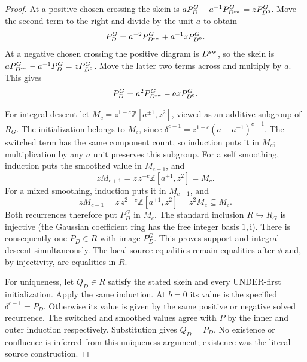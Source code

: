 \begin{proof}
At a positive chosen crossing the skein is
$aP_D^G-a^{-1}P_{D^{\rm sw}}^G=zP_{D^0}^G$.
Move the second term to the right and divide by the unit $a$ to obtain
\begin{equation}\label{lp:positive}
 P_D^G=a^{-2}P_{D^{\rm sw}}^G+a^{-1}zP_{D^0}^G.
\end{equation}
At a negative chosen crossing the positive diagram is $D^{\rm sw}$,
so the skein is $aP_{D^{\rm sw}}^G-a^{-1}P_D^G=zP_{D^0}^G$.
Move the latter two terms across and multiply by $a$. This gives
\begin{equation}\label{lp:negative}
 P_D^G=a^2P_{D^{\rm sw}}^G-azP_{D^0}^G.
\end{equation}

For integral descent let $M_c=z^{1-c}\mathbb Z[a^{\pm1},z^2]$,
viewed as an additive subgroup of $R_G$. The initialization belongs to
$M_c$, since $\delta^{c-1}=z^{1-c}(a-a^{-1})^{c-1}$.
The switched term has the same component count, so induction puts it in
$M_c$; multiplication by any $a$ unit preserves this subgroup. For a self
smoothing, induction puts the smoothed value in $M_{c+1}$, and
\begin{equation}\label{lp:self-support}
 zM_{c+1}=z\,z^{-c}\mathbb Z[a^{\pm1},z^2]=M_c.
\end{equation}
For a mixed smoothing, induction puts it in $M_{c-1}$, and
\begin{equation}\label{lp:mixed-support}
 zM_{c-1}=z\,z^{2-c}\mathbb Z[a^{\pm1},z^2]
             =z^2M_c\subseteq M_c.
\end{equation}
Both recurrences therefore put $P_D^G$ in $M_c$. The standard inclusion
$R\hookrightarrow R_G$ is injective (the Gaussian coefficient ring has
the free integer basis $1,\mathrm i$). There is consequently one $P_D\in R$
with image $P_D^G$. This proves support and integral descent simultaneously.
The local source equalities remain equalities after $\phi$ and, by
injectivity, are equalities in $R$.

For uniqueness, let $Q_D\in R$ satisfy the stated skein and every
UNDER-first initialization. Apply the same induction. At $b=0$ its value
is the specified $\delta^{c-1}=P_D$. Otherwise its value is given by the
same positive or negative solved recurrence. The switched and smoothed
values agree with $P$ by the inner and outer induction respectively.
Substitution gives $Q_D=P_D$. No existence or confluence is inferred from
this uniqueness argument; existence was the literal source construction.


\end{proof}
